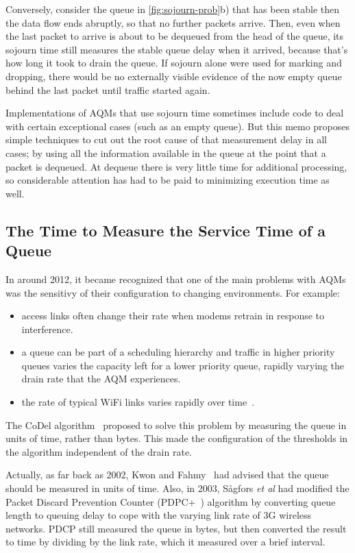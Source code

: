Conversely, consider the queue in \autoref{fig:sojourn-prob}b) that has been stable then the data flow ends abruptly, so that no further packets arrive. Then, even when the last packet to arrive is about to be dequeued from the head of the queue, its sojourn time still measures the stable queue delay when it arrived, because that's how long it took to drain the queue. If sojourn alone were used for marking and dropping, there would be no externally visible evidence of the now empty queue behind the last packet until traffic started again.

Implementations of AQMs that use sojourn time sometimes include code to deal with certain exceptional cases (such as an empty queue). But this memo proposes simple techniques to cut out the root cause of that measurement delay in all cases; by using all the information available in the queue at the point that a packet is dequeued. At dequeue there is very little time for additional processing, so considerable attention has had to be paid to minimizing execution time as well.

\subsection{The Time to Measure the Service Time of a Queue}\label{sec:svc_time}

In around 2012, it became recognized that one of the main problems with AQMs was the sensitivy of their configuration to changing environments. For example:
\begin{itemize}
	\item access links often change their rate when modems retrain in response to interference. 
	\item a queue can be part of a scheduling hierarchy and traffic in higher priority queues varies the capacity left for a lower priority queue, rapidly varying the drain rate that the AQM experiences.
	\item the rate of typical WiFi links varies rapidly over time~\cite{McGregor10:Minstrel_TR}.
\end{itemize}

The CoDel algorithm~\cite{Nichols12:CoDel} proposed to solve this problem by measuring the queue in units of time, rather than bytes. This made the configuration of the thresholds in the algorithm independent of the drain rate.

Actually, as far back as 2002, 
Kwon and Fahmy~\cite{Kwon02:Load_v_Queue_AQM} had advised that the queue should 
be measured in units of time. Also, in 2003, S{\aa}gfors \emph{et al} had 
modified the Packet Discard Prevention Counter (PDPC+~\cite{Sagfors03:PDPC_vary}) 
algorithm by converting queue length to queuing delay to cope with the varying 
link rate of 3G wireless networks. PDCP still measured the queue in bytes, but then converted the result to time by dividing by the link rate, which it measured over a brief interval. 

